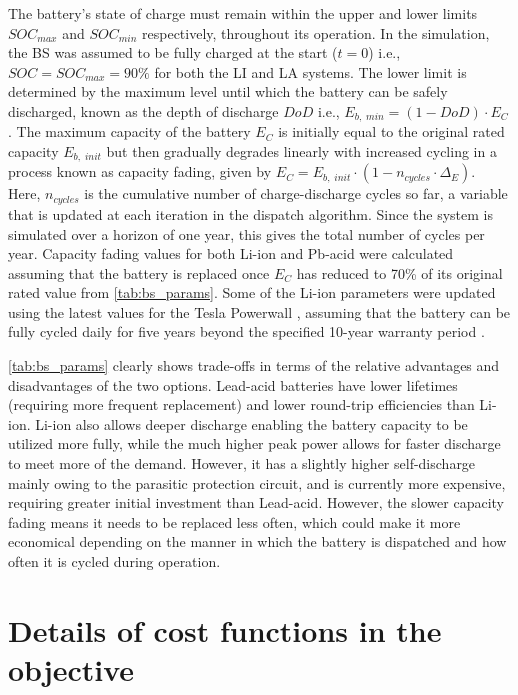 \documentclass[final,3p,times]{elsarticle}
\begin{document}
The battery's state of charge must remain within the upper and lower limits $SOC_{max}$ and $SOC_{min}$ respectively, throughout its operation. In the simulation, the BS was assumed to be fully charged at the start ($t = 0$) i.e., $SOC = SOC_{max} = 90\%$ for both the LI and LA systems. The lower limit is determined by the maximum level until which the battery can be safely discharged, known as the depth of discharge $DoD$ i.e., $E_{b,\;min} = (1 - DoD)\cdot E_C$. The maximum capacity of the battery $E_C$ is initially equal to the original rated capacity $E_{b,\; init}$ but then gradually degrades linearly with increased cycling in a process known as capacity fading, given by $E_C = E_{b,\; init} \cdot (1 - n_{cycles}\cdot \Delta_E)$. Here, $n_{cycles}$ is the cumulative number of charge-discharge cycles so far, a variable that is updated at each iteration in the dispatch algorithm. Since the system is simulated over a horizon of one year, this gives the total number of cycles per year. Capacity fading values for both Li-ion and Pb-acid were calculated assuming that the battery is replaced once $E_C$ has reduced to 70\% of its original rated value from \cref{tab:bs_params}. %
Some of the Li-ion parameters were updated using the latest values for the Tesla Powerwall \cite{powerwall}, assuming that the battery can be fully cycled daily for five years beyond the specified 10-year warranty period \cite{bs_source}.

\cref{tab:bs_params} clearly shows trade-offs in terms of the relative advantages and disadvantages of the two options. Lead-acid batteries have lower lifetimes (requiring more frequent replacement) and lower round-trip efficiencies than Li-ion. Li-ion also allows deeper discharge enabling the battery capacity to be utilized more fully, while the much higher peak power allows for faster discharge to meet more of the demand. However, it has a slightly higher self-discharge mainly owing to the parasitic protection circuit, and is currently more expensive, requiring greater initial investment than Lead-acid. However, the slower capacity fading means it needs to be replaced less often, which could make it more economical depending on the manner in which the battery is dispatched and how often it is cycled during operation. 

\section{Details of cost functions in the objective \label{app:costs}}
\end{document}
